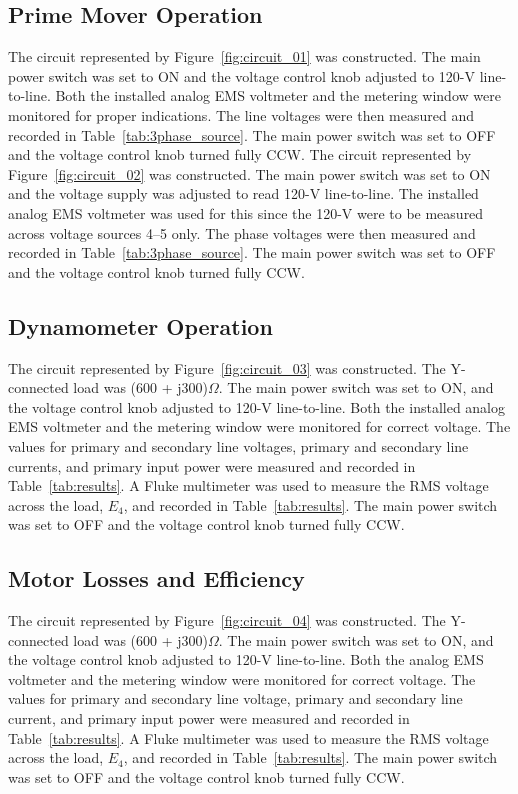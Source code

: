 \documentclass{article}
\begin{document}
\subsection{Prime Mover Operation}
\label{part1} The circuit represented by Figure~\ref{fig:circuit_01} was
constructed.  The main power switch was set to ON and the voltage control knob
adjusted to 120-V line-to-line. Both the installed analog EMS voltmeter and the
metering window were monitored for proper indications. The line voltages were
then measured and recorded in Table~\ref{tab:3phase_source}. The main power
switch was set to OFF and the voltage control knob turned fully {CCW}. The
circuit represented by Figure~\ref{fig:circuit_02} was constructed. The main
power switch was set to ON and the voltage supply was adjusted to read 120-V
line-to-line. The installed analog EMS voltmeter was used for this since the
120-V were to be measured across voltage sources 4--5 only. The phase voltages
were then measured and recorded in Table~\ref{tab:3phase_source}.  The main
power switch was set to OFF and the voltage control knob turned fully {CCW}.

\subsection{Dynamometer Operation}
\label{part2} The circuit represented by Figure~\ref{fig:circuit_03} was
constructed.  The Y-connected load was (600 + j300)$\Omega$. The main power
switch was set to ON, and the voltage control knob adjusted to 120-V
line-to-line. Both the installed analog EMS voltmeter and the metering window
were monitored for correct voltage.  The values for primary and secondary line
voltages, primary and secondary line currents, and primary input power were
measured and recorded in Table~\ref{tab:results}. A Fluke multimeter was used
to measure the RMS voltage across the load, $E_4$, and recorded in
Table~\ref{tab:results}.  The main power switch was set to OFF and the voltage
control knob turned fully {CCW}.

\subsection{Motor Losses and Efficiency}
\label{part3} The circuit represented by Figure~\ref{fig:circuit_04} was
constructed.  The Y-connected load was (600 + j300)$\Omega$. The main power
switch was set to ON, and the voltage control knob adjusted to 120-V
line-to-line. Both the analog EMS voltmeter and the metering window were
monitored for correct voltage. The values for primary and secondary line
voltage, primary and secondary line current, and primary input power were
measured and recorded in Table~\ref{tab:results}. A Fluke multimeter was used
to measure the RMS voltage across the load, $E_4$, and recorded in
Table~\ref{tab:results}.  The main power switch was set to OFF and the voltage
control knob turned fully {CCW}.
\end{document}
